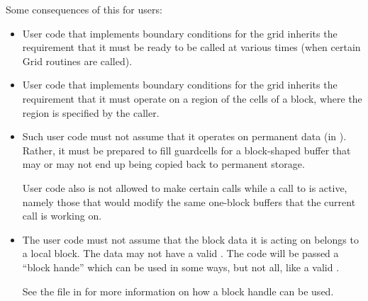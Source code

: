 Some consequences of this for \flashx users:
\begin{itemize}
\item
User code that implements boundary conditions for the grid inherits
the requirement that it must be ready to be called at various times
(when certain \unit{Grid} routines are called).
\item
User code that implements boundary conditions for the grid inherits
the requirement that it must operate on a region of the cells of
a block, where the region is specified by the caller.
\item
Such user code must not assume that it operates on permanent data (in  \etc).
Rather, it must be prepared to fill guardcells for a block-shaped buffer
that may or may not end up being copied back to permanent storage.

User code also is not allowed to make certain  calls while
a call to   is active, namely those that
would modify the same one-block buffers that the current call
is working on.
\item
The user code must not assume that the block data it is acting on belongs to
a local block. The data may not have a valid .
The code will be passed a ``block hande'' which can be used
in some ways, but not all, like a valid .
\begin{flashtip}
See the  file in 
for more information on how a block handle can be used.
\end{flashtip}
\end{itemize}

